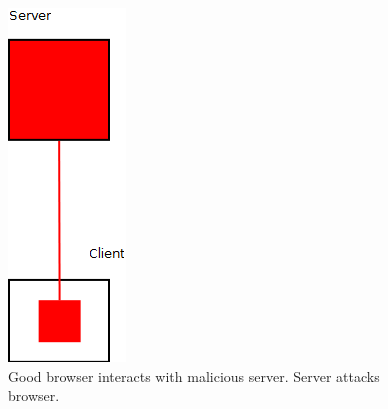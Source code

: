 \begin{figure}
	\begin{center}		
		\includegraphics[width=0.6\columnwidth]{img/security/threat-scenario-good-browser-bad-server}
		\caption{Good browser interacts with malicious server. Server attacks browser.}
		\label{fig:threat-scenario:good-browser-bad-server}
	\end{center}
\end{figure}


